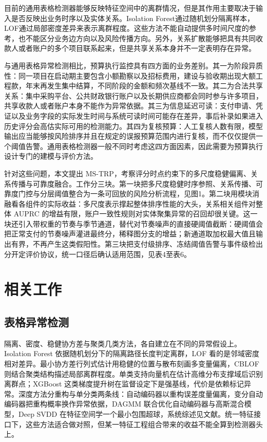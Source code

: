 \documentclass[twocolumn,11pt]{ctexart}
\begin{document}
目前的通用表格检测器能够反映特征空间中的离群情况，但是其作用主要取决于输入是否反映出业务时序以及实体关系。Isolation Forest通过随机划分隔离样本\cite{ref2}，LOF通过局部密度差异来表示离群程度\cite{ref3}。这些方法不能自动提供多时间尺度的参考，也不能区分业务边方向以及风险传播方向。另外，关系扩散能够把具有共同收款人或者账户的多个项目联系起来，但是共享关系本身并不一定表明存在异常。

与通用表格异常检测相比，预算执行监控具有四方面的业务差别。其一为阶段异质性：同一项目在启动期主要包含小额勘察以及招标费用，建设与验收期出现大额工程款，年末再发生集中结算，不同阶段的金额和频次基线不一致。其二为合法共享关系：集中采购平台、公共财政银行账户以及长期供应商都会同时参与许多项目，共享收款人或者账户本身不能作为异常依据。其三为信息延迟可读：支付申请、凭证以及业务字段的实际发生时间与系统可读时间可能存在差异，事后补录如果进入历史评分会高估实际可用的检测能力。其四为复核预算：人工复核人数有限，模型输出应当能够按风险排序并且在规定的误报预算范围内进行复核，而不仅仅提供一个阈值告警。通用表格检测器一般不同时考虑这四方面因素，因此需要为预算执行设计专门的建模与评价方法。

针对这些问题，本文提出 MS-TRP，考察评分时点约束下的多尺度稳健偏离、关系传播与可靠度融合。工作分三块。第一块把多尺度稳健时序参照、关系传播、可靠度门控与分层阈值整合为一条可回放的风险分析流程，见图1。第二块用模块消融看各组件的实际收益：多尺度表示撑起整体排序性能的大头，关系相关组件对整体 AUPRC 的增益有限，账户一致性规则对实体聚集异常的召回却很关键。这一块还引入带权重的节奏与季节通道，替代对节奏噪声的直接硬阈值截断：硬阈值会把正常支付的节奏噪声灌进最终分，稀释图分支的增益；新通道取加权最大值且输出有界，不再产生这类假阳性。第三块把支付级排序、冻结阈值告警与事件级检出分开定评价协议，统一口径后确认适用范围，见表4至表6。

\section{相关工作}
\subsection{表格异常检测}
隔离、密度、稳健协方差与聚类几类方法，各自建立在不同的异常假设上。Isolation Forest 依据随机划分下的隔离路径长度判定离群\cite{ref2}，LOF 看的是邻域密度相对差异\cite{ref3}。最小协方差行列式估计用稳健的位置与散布刻画多变量偏离\cite{ref4}，CBLOF 则结合聚类结构描述局部离群程度\cite{ref5}。单类支持向量机在估计高维分布支撑域后识别离群点\cite{ref6}；XGBoost 这类梯度提升树在监督设定下是强基线，代价是依赖标记异常\cite{ref7}。深度方法分重构与单分类两条线：自动编码器以重构误差度量偏离\cite{ref8}，变分自动编码器把重构概率换作异常依据\cite{ref9}，DAGMM 联合优化自动编码器与高斯混合模型\cite{ref10}，Deep SVDD 在特征空间学一个最小包围超球\cite{ref11}，系统综述见文献\cite{ref12}。统一特征接口下，这些方法适合做对照，但某一特征工程组合带来的收益不能全算到检测器头上。
\end{document}
